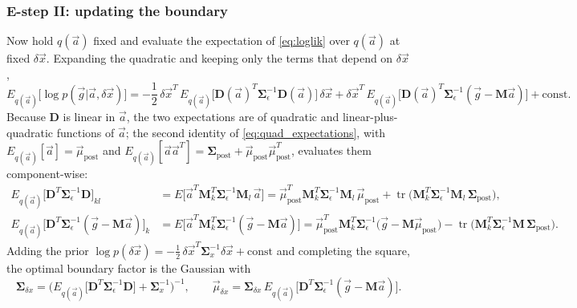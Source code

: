 \documentclass{article}
\begin{document}
\subsubsection*{E-step II: updating the boundary} \label{sec:estep_x}
Now hold $q(\vec a)$ fixed and evaluate the expectation of \eqref{eq:loglik} over $q(\vec a)$ at fixed $\delta\vec x$. Expanding the quadratic and keeping only the terms that depend on $\delta\vec x$,
\begin{equation}
    E_{q(\vec a)}\big[\log p(\vec g|\vec a, \delta\vec x)\big] = -\frac12\, \delta\vec x^T\, E_{q(\vec a)}\big[\mathbf D(\vec a)^T\mathbf{\Sigma}_\epsilon^{-1}\mathbf D(\vec a)\big]\,\delta\vec x + \delta\vec x^T\, E_{q(\vec a)}\big[\mathbf D(\vec a)^T \mathbf{\Sigma}_\epsilon^{-1}(\vec g - \mathbf M\vec a)\big] + \text{const}.
\end{equation}
Because $\mathbf D$ is linear in $\vec a$, the two expectations are of quadratic and linear-plus-quadratic functions of $\vec a$; the second identity of \eqref{eq:quad_expectations}, with $E_{q(\vec a)}[\vec a] = \vec\mu_{\text{post}}$ and $E_{q(\vec a)}[\vec a\vec a^T] = \mathbf{\Sigma}_{\text{post}} + \vec\mu_{\text{post}}\vec\mu_{\text{post}}^T$, evaluates them component-wise:
\begin{align}
    E_{q(\vec a)}\big[\mathbf D^T\mathbf{\Sigma}_\epsilon^{-1}\mathbf D\big]_{kl} &= E\big[\vec a^T \mathbf M_k^T\mathbf{\Sigma}_\epsilon^{-1}\mathbf M_l\, \vec a\big] = \vec{\mu}_{\text{post}}^T\mathbf M_k^T\mathbf{\Sigma}_\epsilon^{-1}\mathbf M_l\,\vec{\mu}_{\text{post}}+\operatorname{tr}\big(\mathbf M_k^T\mathbf{\Sigma}_\epsilon^{-1}\mathbf M_l\,\mathbf{\Sigma}_{\text{post}}\big), \label{eq:vb_boundary_precision}\\
    E_{q(\vec a)}\big[\mathbf D^T\mathbf{\Sigma}_\epsilon^{-1}(\vec g - \mathbf M \vec a)\big]_{k} &= E\big[\vec a^T\mathbf M_k^T \mathbf{\Sigma}_\epsilon^{-1}(\vec g - \mathbf M\vec a)\big] = \vec{\mu}_{\text{post}}^T\mathbf M_k^T\mathbf{\Sigma}_\epsilon^{-1}\big(\vec{g}-\mathbf{M}\vec{\mu}_{\text{post}}\big)-\operatorname{tr}\big(\mathbf M_k^T\mathbf{\Sigma}_\epsilon^{-1}\mathbf{M}\,\mathbf{\Sigma}_{\text{post}}\big). \label{eq:vb_boundary_shift}
\end{align}
Adding the prior $\log p(\delta\vec x) = -\frac12\,\delta\vec x^T\mathbf{\Sigma}_x^{-1}\delta\vec x + \text{const}$ and completing the square, the optimal boundary factor is the Gaussian with
\begin{equation}
    \mathbf{\Sigma}_{\delta x} = \Big(E_{q(\vec a)}\big[\mathbf D^T\mathbf{\Sigma}_\epsilon^{-1}\mathbf D\big]+\mathbf{\Sigma}_x^{-1}\Big)^{-1},\qquad
    \vec{\mu}_{\delta x}=\mathbf{\Sigma}_{\delta x}\, E_{q(\vec a)}\big[\mathbf D^T\mathbf{\Sigma}_\epsilon^{-1}(\vec g - \mathbf M\vec a)\big]. \label{eq:vb_boundary_update}
\end{equation}
\end{document}
